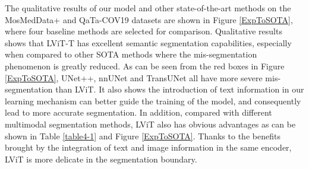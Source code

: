 \documentclass[lettersize,journal]{IEEEtran}
\begin{document}
The qualitative results of our model and other state-of-the-art methods on the MosMedData+ and QaTa-COV19 datasets are shown in Figure \ref{ExpToSOTA}, where four baseline methods are selected for comparison.
Qualitative results shows that LViT-T has excellent semantic segmentation capabilities, especially when compared to other SOTA methods where the mis-segmentation phenomenon is greatly reduced. As can be seen from the red boxes in Figure \ref{ExpToSOTA}, UNet++, nnUNet and TransUNet all have more severe mis-segmentation than LViT. It also shows the introduction of text information in our learning mechanism can better guide the training of the model, and consequently lead to more accurate segmentation. In addition, compared with different multimodal segmentation methods, LViT also has obvious advantages as can be shown in Table \ref{table4-1} and Figure \ref{ExpToSOTA}. Thanks to the benefits brought by the integration of text and image information in the same encoder, LViT is more delicate in the segmentation boundary.
\end{document}
